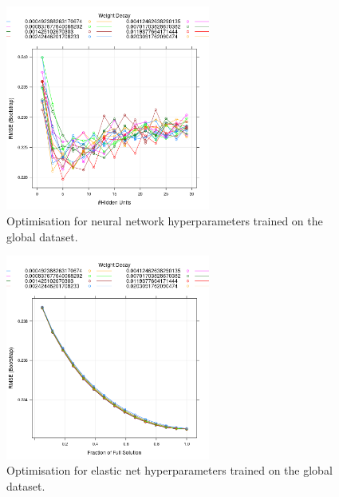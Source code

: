 \documentclass[review]{elsarticle}
\begin{document}
\begin{figure}[h!]
  \centering
  \includegraphics[width=0.6\textwidth]{figs/SI/nnetopt_global.png}
\caption{
  Optimisation for neural network hyperparameters trained on the global dataset.
}

\end{figure}


\begin{figure}[h!]
  \centering
  \includegraphics[width=0.6\textwidth]{figs/SI/enetopt_global.png}
\caption{
  Optimisation for elastic net hyperparameters trained on the global dataset.
}
\end{figure}
\end{document}
